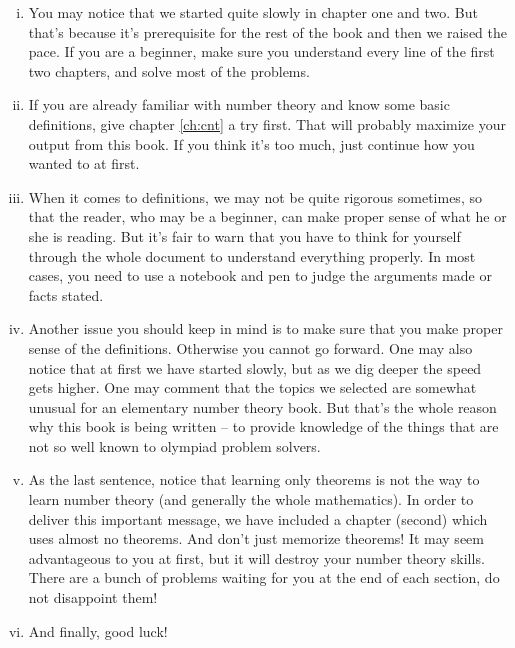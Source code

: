 \documentclass[main.tex]{subfile}
\begin{document}
	\begin{enumerate}[i.] 
		\item You may notice that we started quite slowly in chapter one and two. But that's because it's prerequisite for the rest of the book and then we raised the pace. If you are a beginner, make sure you understand every line of the first two chapters, and solve most of the problems.
		\item If you are already familiar with number theory and know some basic definitions, give chapter \eqref{ch:cnt} a try first. That will probably maximize your output from this book. If you think it's too much, just continue how you wanted to at first.
		\item When it comes to definitions, we may not be quite rigorous sometimes, so that the reader, who may be a beginner, can make proper sense of what he or she is reading. But it's fair to warn that you have to think for yourself through the whole document to understand everything properly. In most cases, you need to use a notebook and pen to judge the arguments made or facts stated.
		\item Another issue you should keep in mind is to make sure that you make proper sense of the definitions. Otherwise you cannot go forward. One may also notice that at first we have started slowly, but as we dig deeper the speed gets higher. One may comment that the topics we selected are somewhat unusual for an elementary number theory book. But that's the whole reason why this book is being written -- to provide knowledge of the things that are not so well known to olympiad problem solvers.
		\item As the last sentence, notice that learning only theorems is not the way to learn number theory (and generally the whole mathematics). In order to deliver this important message, we have included a chapter (second) which uses almost no theorems. And don't just memorize theorems! It may seem advantageous to you at first, but it will destroy your number theory skills. There are a bunch of problems waiting for you at the end of each section, do not disappoint them!
		\item And finally, good luck!
	\end{enumerate}
	
	
\end{document}
